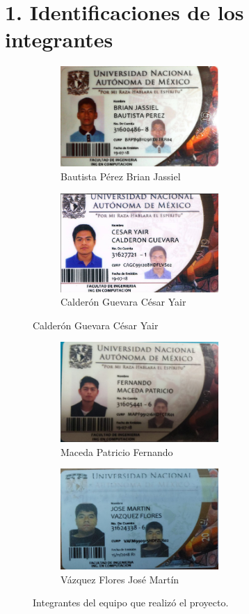 \documentclass[letterpaper]{report}
\begin{document}
    \section*{1. Identificaciones de los integrantes}
    
        \begin{figure}[h]
            \centering
            \begin{subfigure}{7cm}
                \includegraphics[width = 6cm]{img/Cr_Brian.jpg}
                \caption{Bautista P\'erez Brian Jassiel}
            \end{subfigure}
            \begin{subfigure}{7cm}
                \includegraphics[width = 6cm]{img/Cr_Cesar}
                \caption{Calder\'on Guevara C\'esar Yair}
            \end{subfigure}
        \end{figure}
        \begin{figure}[h]
            \centering
            \begin{subfigure}{7cm}
                \includegraphics[width = 6cm]{img/Cr_Fer}
                \caption{Maceda Patricio Fernando}
            \end{subfigure}
            \begin{subfigure}{7cm}
                \includegraphics[width = 6cm]{img/Cr_Martin}
                \caption{V\'azquez Flores Jos\'e Mart\'in}
            \end{subfigure}
            \caption*{Integrantes del equipo que realiz\'o el proyecto.}
        \end{figure}
\end{document}
